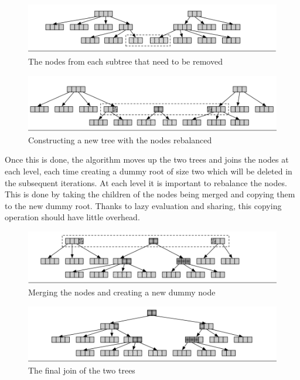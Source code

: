 \documentclass[11pt,a4paper,oneside]{article}
\begin{document}
\begin{figure}[H]
	\centering
	\includegraphics[scale=0.5]{img/concat1.png}
	\caption{The nodes from each subtree that need to be removed\citep{stucki2015rrb}}
\end{figure}

\begin{figure}[H]
	\centering
	\includegraphics[scale=0.5]{img/concat2.png}
	\caption{Constructing a new tree with the nodes rebalanced\citep{stucki2015rrb}}
\end{figure}

Once this is done, the algorithm moves up the two trees and joins the nodes at each level, each time creating a dummy root of size two which will be deleted in the subsequent iterations. At each level it is important to rebalance the nodes. This is done by taking the children of the nodes being merged and copying them to the new dummy root. Thanks to lazy evaluation and sharing, this copying operation should have little overhead.

\begin{figure}[H]
	\centering
	\includegraphics[scale=0.5]{img/concat3.png}
	\caption{Merging the nodes and creating a new dummy node\citep{stucki2015rrb}}
\end{figure}

\begin{figure}[H]
	\centering
	\includegraphics[scale=0.5]{img/concat4.png}
	\caption{The final join of the two trees\citep{stucki2015rrb}}
\end{figure}
\end{document}
